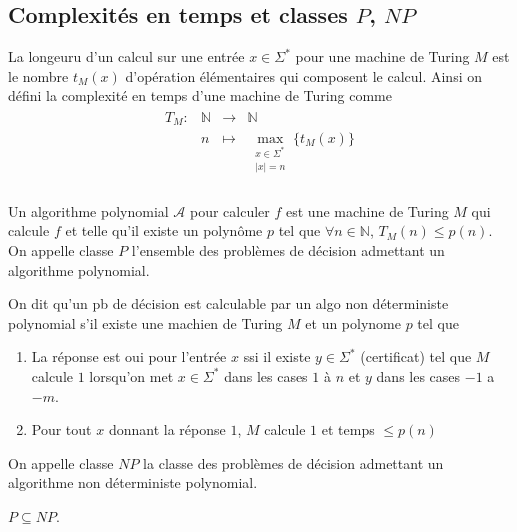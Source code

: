        \subsection{Complexités en temps et classes $P$, $NP$}
            \begin{defi}
                La longeuru d'un calcul sur une entrée $x \in \Sigma^*$ pour une machine de Turing $M$ est le nombre $t_M(x)$ d'opération élémentaires qui composent le calcul. Ainsi on défini la complexité en temps d'une machine de Turing comme
                \begin{align*}
                    \begin{array}{cccc}
                        T_M : & \mathbb{N} & \to & \mathbb{N} \\
                        & n & \mapsto & \max_{\substack{x \in \Sigma^* \\ |x| = n}} \{t_M(x)\} \\
                    \end{array}
                \end{align*}
            \end{defi}
            \begin{defi}
                Un algorithme polynomial $\mathcal{A}$ pour calculer $f$ est une machine de Turing $M$ qui calcule $f$ et telle qu'il existe un polynôme $p$ tel que $\forall n \in \mathbb{N}$, $T_M(n) \leq p(n)$. On appelle classe $P$ l'ensemble des problèmes de décision admettant un algorithme polynomial.
            \end{defi}
            \begin{defi}
                On dit qu'un pb de décision est calculable par un algo non déterministe polynomial s'il existe une machien de Turing $M$ et un polynome $p$ tel que 
                \begin{enumerate}
                    \item La réponse est oui pour l'entrée $x$ ssi il existe $y \in \Sigma^*$ (certificat) tel que $M$ calcule $1$ lorsqu'on met $x \in \Sigma^*$ dans les cases $1$ à $n$ et $y$ dans les cases $-1$ a $-m$.
                    \item Pour tout $x$ donnant la réponse $1$, $M$ calcule $1$ et temps $\leq p(n)$
                \end{enumerate}
                On appelle classe $NP$ la classe des problèmes de décision admettant un algorithme non déterministe polynomial.
            \end{defi}
            \begin{remq}
                $P \subseteq NP$.
            \end{remq}
            

